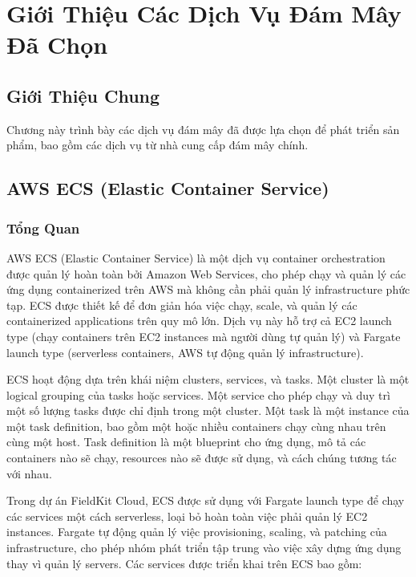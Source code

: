 \section{Giới Thiệu Các Dịch Vụ Đám Mây Đã Chọn}

\subsection{Giới Thiệu Chung}

Chương này trình bày các dịch vụ đám mây đã được lựa chọn để phát triển sản phẩm, bao gồm các dịch vụ từ nhà cung cấp đám mây chính.

\subsection{AWS ECS (Elastic Container Service)}

\subsubsection{Tổng Quan}

AWS ECS (Elastic Container Service) là một dịch vụ container orchestration được quản lý hoàn toàn bởi Amazon Web Services, cho phép chạy và quản lý các ứng dụng containerized trên AWS mà không cần phải quản lý infrastructure phức tạp. ECS được thiết kế để đơn giản hóa việc chạy, scale, và quản lý các containerized applications trên quy mô lớn. Dịch vụ này hỗ trợ cả EC2 launch type (chạy containers trên EC2 instances mà người dùng tự quản lý) và Fargate launch type (serverless containers, AWS tự động quản lý infrastructure).

ECS hoạt động dựa trên khái niệm clusters, services, và tasks. Một cluster là một logical grouping của tasks hoặc services. Một service cho phép chạy và duy trì một số lượng tasks được chỉ định trong một cluster. Một task là một instance của một task definition, bao gồm một hoặc nhiều containers chạy cùng nhau trên cùng một host. Task definition là một blueprint cho ứng dụng, mô tả các containers nào sẽ chạy, resources nào sẽ được sử dụng, và cách chúng tương tác với nhau.

Trong dự án FieldKit Cloud, ECS được sử dụng với Fargate launch type để chạy các services một cách serverless, loại bỏ hoàn toàn việc phải quản lý EC2 instances. Fargate tự động quản lý việc provisioning, scaling, và patching của infrastructure, cho phép nhóm phát triển tập trung vào việc xây dựng ứng dụng thay vì quản lý servers. Các services được triển khai trên ECS bao gồm:

